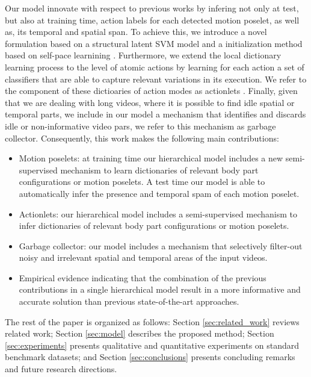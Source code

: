 Our model innovate with respect to previous works by infering not only at test, 
but also at training time, action labels for each detected motion poselet, as 
well as, its temporal and spatial span. To achieve this, we introduce a novel 
formulation based on a structural latent SVM model \cite{Yu:Joachims:2010} and a 
initialization method based on self-pace learnining \cite{Kumar:EtAl:2010}. 
Furthermore, we extend the local dictionary learning process to the level of 
atomic actions by learning for each action a set of classifiers that are able to 
capture relevant variations in its execution. We refer to the component of these 
dictioaries of action modes as actionlets \cite{Wang:EtAl:2012}. Finally, given 
that we are dealing with long videos, where it is possible to find idle spatial 
or temporal parts, we include in our model a mechanism that identifies and 
discards idle or non-informative video pars, we refer to this mechanism as 
garbage collector. Consequently, this work makes the following main 
contributions:

\begin{itemize}

\item Motion poselets: at training time our hierarchical model includes a 
new semi-supervised mechanism to learn dictionaries of relevant body 
part configurations or motion poselets. A test time our model is able to 
automatically infer the presence and temporal spam of each motion poselet.


\item Actionlets: our hierarchical model includes a 
semi-supervised mechanism to infer dictionaries of relevant body 
part configurations or motion poselets. 

\item Garbage collector: our model includes a mechanism that
selectively filter-out noisy and irrelevant spatial and temporal areas of the
input videos.

 \item Empirical evidence indicating that the 
combination of the previous
contributions in a single hierarchical model result in a more informative and 
accurate solution than previous state-of-the-art approaches.

\end{itemize}

The rest of the paper is organized as follows:
Section \ref{sec:related_work} reviews related work;
Section \ref{sec:model} describes the proposed method;
Section \ref{sec:experiments}  presents qualitative and quantitative experiments
on standard benchmark datasets;
and Section \ref{sec:conclusions} presents concluding remarks and future research
directions.
